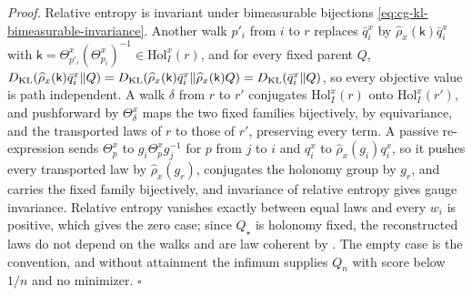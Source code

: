 \noindent\emph{Proof.}
Relative entropy is invariant under bimeasurable bijections \eqref{eq:cg-kl-bimeasurable-invariance}.
Another walk $p'_i$ from $i$ to $r$ replaces $\bar q^x_i$ by $\widehat\rho_x(\mathsf k)\bar q^x_i$ with
$\mathsf k=\Theta^x_{p'_i}(\Theta^x_{p_i})^{-1}\in\mathrm{Hol}^x_I(r)$, and for every fixed parent $Q$,
$D_{\mathrm{KL}}(\widehat\rho_x(\mathsf k)\bar q^x_i\Vert Q)=D_{\mathrm{KL}}(\widehat\rho_x(\mathsf k)\bar q^x_i\Vert\widehat\rho_x(\mathsf k)Q)=D_{\mathrm{KL}}(\bar q^x_i\Vert Q)$,
so every objective value is path independent. A walk $\delta$ from $r$ to $r'$ conjugates
$\mathrm{Hol}^x_I(r)$ onto $\mathrm{Hol}^x_I(r')$, and pushforward by $\Theta^x_\delta$ maps the two fixed
families bijectively, by equivariance, and the transported laws of $r$ to those of $r'$, preserving every
term. A passive re-expression sends $\Theta^x_p$ to $g_i\Theta^x_pg_j^{-1}$ for $p$ from $j$ to $i$ and
$q^x_i$ to $\widehat\rho_x(g_i)q^x_i$, so it pushes every transported law by $\widehat\rho_x(g_r)$,
conjugates the holonomy group by $g_r$, and carries the fixed family bijectively, and invariance of
relative entropy gives gauge invariance. Relative entropy vanishes exactly between equal laws and every
$w_i$ is positive, which gives the zero case; since $Q_\star$ is holonomy fixed, the reconstructed laws do
not depend on the walks and are law coherent by . The empty case is the
convention, and without attainment the infimum supplies $Q_n$ with score below $1/n$ and no minimizer.
$\square$


